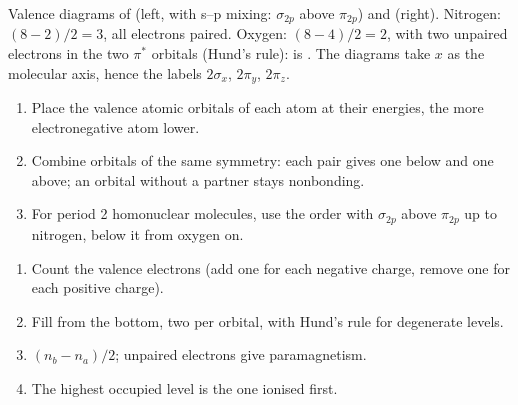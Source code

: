 \begin{omfigure}
\begin{MOdiagram}[names, labels, style=square, distance=4.2cm, labels-fs=\scriptsize]
\end{MOdiagram}
\hfill
\begin{MOdiagram}[names, labels, style=square, distance=4.2cm, labels-fs=\scriptsize]
\end{MOdiagram}

{\small Valence  diagrams of  (left, with s--p mixing:
$\sigma_{2p}$ above $\pi_{2p}$) and  (right). Nitrogen: 
$(8 - 2)/2 = 3$, all electrons paired. Oxygen:  $(8 - 4)/2 = 2$, with two
unpaired electrons in the two $\pi^*$ orbitals (Hund's rule):  is
. The diagrams take $x$ as the molecular axis, hence the labels
$2\sigma_x$, $2\pi_y$, $2\pi_z$.}
\end{omfigure}

\begin{method}\label{met:b2:diatomic-mos:build-diagram}
\begin{enumerate}
  \item Place the valence atomic orbitals of each atom at their energies, the more
        electronegative atom lower.
  \item Combine orbitals of the same symmetry: each pair gives one 
        below and one  above; an orbital without a partner stays
        nonbonding.
  \item For period 2 homonuclear molecules, use the order with $\sigma_{2p}$ above
        $\pi_{2p}$ up to nitrogen, below it from oxygen on.
\end{enumerate}
\end{method}

\begin{method}\label{met:b2:diatomic-mos:fill}
\begin{enumerate}
  \item Count the valence electrons (add one for each negative charge, remove one
        for each positive charge).
  \item Fill from the bottom, two per orbital, with Hund's rule for degenerate
        levels.
  \item {} $(n_b - n_a)/2$; unpaired electrons give paramagnetism.
  \item The highest occupied level is the one ionised first.
\end{enumerate}
\end{method}

